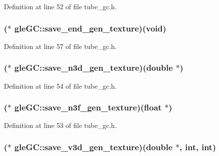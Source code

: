 Definition at line 52 of file tube\-\_\-gc.\-h.

\hypertarget{structgle_g_c_abbf86009d37eda20a1a2415caabccfe1}{
\subsubsection[{save\-\_\-end\-\_\-gen\-\_\-texture}]{($\ast$ gle\-G\-C\-::save\-\_\-end\-\_\-gen\-\_\-texture)({\bf void})}}\label{structgle_g_c_abbf86009d37eda20a1a2415caabccfe1}


Definition at line 57 of file tube\-\_\-gc.\-h.

\hypertarget{structgle_g_c_abe902a1ec7d19b571ab7bf120bca5595}{
\subsubsection[{save\-\_\-n3d\-\_\-gen\-\_\-texture}]{($\ast$ gle\-G\-C\-::save\-\_\-n3d\-\_\-gen\-\_\-texture)(double $\ast$)}}\label{structgle_g_c_abe902a1ec7d19b571ab7bf120bca5595}


Definition at line 54 of file tube\-\_\-gc.\-h.

\hypertarget{structgle_g_c_a8f3eeed0ff13ab6fc655904b0760b733}{
\subsubsection[{save\-\_\-n3f\-\_\-gen\-\_\-texture}]{($\ast$ gle\-G\-C\-::save\-\_\-n3f\-\_\-gen\-\_\-texture)(float $\ast$)}}\label{structgle_g_c_a8f3eeed0ff13ab6fc655904b0760b733}


Definition at line 53 of file tube\-\_\-gc.\-h.

\hypertarget{structgle_g_c_a89d72bf9a73ae84cfcdfd5e034011595}{
\subsubsection[{save\-\_\-v3d\-\_\-gen\-\_\-texture}]{($\ast$ gle\-G\-C\-::save\-\_\-v3d\-\_\-gen\-\_\-texture)(double $\ast$, int, int)}}\label{structgle_g_c_a89d72bf9a73ae84cfcdfd5e034011595}


